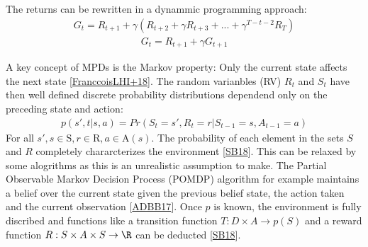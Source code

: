 \documentclass[letterpaper,10pt,english]{jupyterBook}
\begin{document}
\sphinxAtStartPar
The returns can be rewritten in a dynammic programming approach:
\begin{equation*}
\begin{split} G_t = R_{t+1} + \gamma(R_{t+2} + \gamma R_{t+3} + ... + \gamma^{T-t-2}R_T) \end{split}
\end{equation*}\begin{equation*}
\begin{split} G_t = R_{t+1} + \gamma G_{t+1}\end{split}
\end{equation*}
\sphinxAtStartPar
{}

\sphinxAtStartPar
A key concept of MPDs is the Markov property: Only the current state affects the next state {[}\hyperlink{cite.Financial_application:id56}{FranccoisLHI+18}{]}. The random varianbles (RV) \(R_t\) and \(S_t\) have then well defined discrete probability distributions dependend only on the preceding state and action:
\begin{equation*}
\begin{split} p(s', t| s, a) = Pr(S_t = s', R_t = r | S_{t-1} = s, A_{t-1}=a) \end{split}
\end{equation*}
\sphinxAtStartPar
For all \(s', s \in \mathrm{S} , r \in \mathrm{R}, a \in \mathrm{A}(s) \). The probability of each element in the sets \(S\) and \(R\) completely chararcterizes the environment {[}\hyperlink{cite.Financial_application:id55}{SB18}{]}. This can be relaxed by some alogrithms as this is an unrealistic assumption to make. The Partial Observable Markov Decision Process (POMDP) algorithm for example maintains a belief over the current state given the previous belief state, the action taken and the current observation {[}\hyperlink{cite.Financial_application:id51}{ADBB17}{]}.  Once \(p\) is known, the environment is fully discribed and functions like a transition function \(T : D \times A \to p(S)\) and a reward function \(R: S \times A \times S \to \R\) can be deducted {[}\hyperlink{cite.Financial_application:id55}{SB18}{]}.
\end{document}

